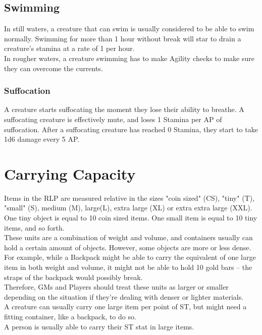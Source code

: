 \subsection{Swimming}\label{subsec:swimming}
In still waters, a creature that can swim is usually considered to be able to swim normally.
Swimming for more than 1 hour without break will star to drain a creature's stamina at a rate of 1 per hour.\\
In rougher waters, a creature swimming has to make Agility checks to make sure they can overcome the currents.\\

\subsubsection{Suffocation}\label{subsubsec:suffocation}
A creature starts suffocating the moment they lose their ability to breathe.
A suffocating creature is effectively mute, and loses 1 Stamina per AP of suffocation.
After a suffocating creature has reached 0 Stamina, they start to take 1d6 damage every 5 AP.

\section{Carrying Capacity}\label{sec:carryingCapacity}
Items in the RLP are measured relative in the sizes "coin sized" (CS), "tiny" (T), "small" (S), medium (M), large(L), extra large (XL) or extra extra large (XXL).\\
One tiny object is equal to 10 coin sized items.
One small item is equal to 10 tiny items, and so forth.\\
These units are a combination of weight and volume, and containers usually can hold a certain amount of objects.
However, some objects are more or less dense.
For example, while a Backpack might be able to carry the equivalent of one large item in both weight and volume, it might not be able to hold 10 gold bars -- the straps of the backpack would possibly break.\\
Therefore, GMs and Players should treat these units as larger or smaller depending on the situation if they're dealing with denser or lighter materials.\\
A creature can usually carry one large item per point of ST, but might need a fitting container, like a backpack, to do so.\\

A person is usually able to carry their ST stat in large items.\\

